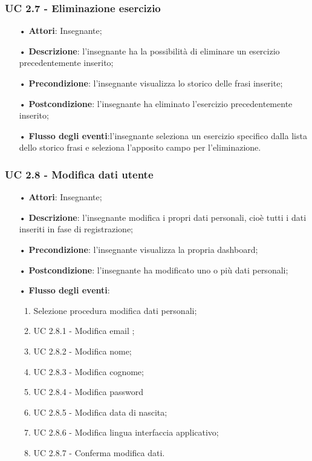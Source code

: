 \subsubsection{UC 2.7 - Eliminazione esercizio}
\begin{itemize}
	\item[•] \textbf{Attori}: Insegnante;
	\item[•] \textbf{Descrizione}: l'insegnante ha la possibilità di eliminare un esercizio precedentemente inserito;
	\item[•] \textbf{Precondizione}: l'insegnante visualizza lo storico delle frasi inserite;
	\item[•] \textbf{Postcondizione}: l'insegnante ha eliminato l'esercizio precedentemente inserito;
	\item[•] \textbf{Flusso degli eventi}:l'insegnante seleziona un esercizio specifico dalla lista dello storico frasi e seleziona l'apposito campo per l'eliminazione.
\end{itemize}


\subsubsection{UC 2.8 - Modifica dati utente}
\begin{itemize}
	\item[•] \textbf{Attori}: Insegnante;
	\item[•] \textbf{Descrizione}: l'insegnante modifica i propri dati personali, cioè tutti i dati inseriti in fase di registrazione;
	\item[•] \textbf{Precondizione}: l'insegnante visualizza la propria dashboard;
	\item[•] \textbf{Postcondizione}: l'insegnante ha modificato uno o più dati personali;
	\item[•] \textbf{Flusso degli eventi}:
	\begin{enumerate}
		\item Selezione procedura modifica dati personali;
		\item UC 2.8.1 - Modifica email ;
		\item UC 2.8.2 - Modifica nome;
		\item UC 2.8.3 - Modifica cognome;
		\item UC 2.8.4 - Modifica password
		\item UC 2.8.5 - Modifica data di nascita;
		\item UC 2.8.6 - Modifica lingua interfaccia applicativo;
		\item UC 2.8.7 - Conferma modifica dati.
	\end{enumerate}
\end{itemize}


